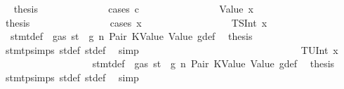 \begin{isabellebody}
\ \isamarkupfalse%
\ {\isacharquery}{\kern0pt}thesis\isanewline
\ \ \ \ \ \ \ \ \ \ \ \ \isamarkupfalse%
\ {\isacharparenleft}{\kern0pt}cases\ c{\isacharparenright}{\kern0pt}\isanewline
\ \ \ \ \ \ \ \ \ \ \ \ \ \ \isamarkupfalse%
\ {\isacharparenleft}{\kern0pt}Value\ x{}{\isacharparenright}{\kern0pt}\isanewline
\ \ \ \ \ \ \ \ \ \ \ \ \ \ \isamarkupfalse%
\ \isamarkupfalse%
\ {\isacharquery}{\kern0pt}thesis\isanewline
\ \ \ \ \ \ \ \ \ \ \ \ \ \ \isamarkupfalse%
\ {\isacharparenleft}{\kern0pt}cases\ x{}{\isacharparenright}{\kern0pt}\isanewline
\ \ \ \ \ \ \ \ \ \ \ \ \ \ \ \ \isamarkupfalse%
\ {\isacharparenleft}{\kern0pt}TSInt\ x{}{\isacharparenright}{\kern0pt}\isanewline
\ \ \ \ \ \ \ \ \ \ \ \ \ \ \ \ \isamarkupfalse%
\ {}{\isacharparenleft}{\kern0pt}{}{\isacharparenright}{\kern0pt}\ stmt{\isacharunderscore}{\kern0pt}def\ {\isacharbackquoteopen}{\isasymnot}\ gas\ st\ {\isasymle}\ g{\isacharbackquoteclose}\ n\ Pair\ KValue\ Value\ g{\isacharunderscore}{\kern0pt}def\ \isamarkupfalse%
\ {\isacharquery}{\kern0pt}thesis\ \isamarkupfalse%
\ stmt{\isachardot}{\kern0pt}psimps{\isacharparenleft}{\kern0pt}{}{\isacharparenright}{\kern0pt}\ st{\isacharprime}{\kern0pt}{\isacharunderscore}{\kern0pt}def\ st{\isacharprime}{\kern0pt}{\isacharprime}{\kern0pt}{\isacharunderscore}{\kern0pt}def\ \isamarkupfalse%
\ simp\isanewline
\ \ \ \ \ \ \ \ \ \ \ \ \ \ \isamarkupfalse%
\isanewline
\ \ \ \ \ \ \ \ \ \ \ \ \ \ \ \ \isamarkupfalse%
\ {\isacharparenleft}{\kern0pt}TUInt\ x{}{\isacharparenright}{\kern0pt}\isanewline
\ \ \ \ \ \ \ \ \ \ \ \ \ \ \ \ \isamarkupfalse%
\ {}{\isacharparenleft}{\kern0pt}{}{\isacharparenright}{\kern0pt}\ stmt{\isacharunderscore}{\kern0pt}def\ {\isacharbackquoteopen}{\isasymnot}\ gas\ st\ {\isasymle}\ g{\isacharbackquoteclose}\ n\ Pair\ KValue\ Value\ g{\isacharunderscore}{\kern0pt}def\ \isamarkupfalse%
\ {\isacharquery}{\kern0pt}thesis\ \isamarkupfalse%
\ stmt{\isachardot}{\kern0pt}psimps{\isacharparenleft}{\kern0pt}{}{\isacharparenright}{\kern0pt}\ st{\isacharprime}{\kern0pt}{\isacharunderscore}{\kern0pt}def\ st{\isacharprime}{\kern0pt}{\isacharprime}{\kern0pt}{\isacharunderscore}{\kern0pt}def\ \isamarkupfalse%
\ simp\isanewline
\ \ \ \ \ \ \ \ \ \ \ \ \ \ \isamarkupfalse%

\end{isabellebody}
